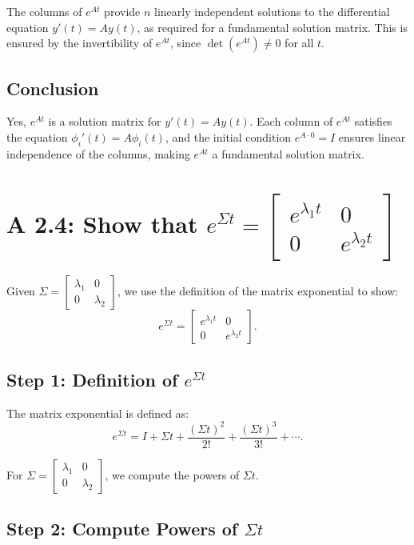 \documentclass[12pt]{article}
\begin{document}
The columns of \(e^{At}\) provide \(n\) linearly independent solutions to the differential equation \(y'(t) = Ay(t)\), as required for a fundamental solution matrix. This is ensured by the invertibility of \(e^{At}\), since \(\det(e^{At}) \neq 0\) for all \(t\).

\subsection*{Conclusion}

Yes, \(e^{At}\) is a solution matrix for \(y'(t) = Ay(t)\). Each column of \(e^{At}\) satisfies the equation \(\phi_i'(t) = A \phi_i(t)\), and the initial condition \(e^{A \cdot 0} = I\) ensures linear independence of the columns, making \(e^{At}\) a fundamental solution matrix.

\section*{A 2.4: Show that \(e^{\Sigma t} = \begin{bmatrix} e^{\lambda_1 t} & 0 \\ 0 & e^{\lambda_2 t} \end{bmatrix}\)}

Given \(\Sigma = \begin{bmatrix} \lambda_1 & 0 \\ 0 & \lambda_2 \end{bmatrix}\), we use the definition of the matrix exponential to show:
\[
e^{\Sigma t} = \begin{bmatrix} e^{\lambda_1 t} & 0 \\ 0 & e^{\lambda_2 t} \end{bmatrix}.
\]

\subsection*{Step 1: Definition of \(e^{\Sigma t}\)}

The matrix exponential is defined as:
\[
e^{\Sigma t} = I + \Sigma t + \frac{(\Sigma t)^2}{2!} + \frac{(\Sigma t)^3}{3!} + \cdots.
\]

For \(\Sigma = \begin{bmatrix} \lambda_1 & 0 \\ 0 & \lambda_2 \end{bmatrix}\), we compute the powers of \(\Sigma t\).

\subsection*{Step 2: Compute Powers of \(\Sigma t\)}
\end{document}
